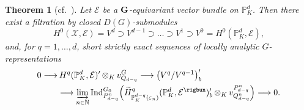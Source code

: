 \documentclass[a4paper, reqno, 10pt]{amsart}
\newtheorem{theorem}{Theorem}[subsection]
\theoremstyle{definition}
\numberwithin{equation}{section}
\newcommand{\botimes}[1]{{\,\otimes_{#1}\,}}
\newcommand{\Ind}{{\mathrm{Ind}}}
\newcommand{\lra}{\longrightarrow}
\newcommand{\BN}{{\mathbb {N}}}
\newcommand{\BP}{{\mathbb {P}}}
\newcommand{\CE}{{\mathcal {E}}}
\newcommand{\CX}{{\mathcal {X}}}
\newcommand{\bG}{{\mathrm{\bf G}}}
\begin{document}
\begin{theorem}[{cf.\ \cite[Thm.\ 2.2.8]{Orlik08EquivVBDrinfeldUpHalfSp}}]\label{Thm 3 - Orliks theorem on global sections of an equivariant vector bundle on the DHS}
	Let $\CE$ be a $\bG$-equivariant vector bundle on $\BP_K^d$.
	Then there exist a filtration by closed $D(G)$-submodules
	\begin{equation*}
		H^0 (\CX,\CE) = V^d \supset V^{d-1} \supset \ldots \supset V^{1} \supset V^{0} = H^0(\BP_K^d, \CE) ,
	\end{equation*}
	and, for $q = 1,\ldots, d$, short strictly exact sequences of locally analytic $G$-representations
	\begin{equation}\label{Eq 3 - Extension from spectral sequence}
		\begin{aligned}
			0 \lra &{\hspace{2pt}} H^q (\BP_K^d, \CE)' \botimes{K} v^G_{Q_{d-q}} \lra \big(V^q/V^{q-1} \big)'_b \\
			&\lra \varinjlim_{n\in \BN} \Ind^{G_0}_{P^n_{d-q}} \Big( \widetilde{H}^q_{\BP_K^{d-q} (\varepsilon_n)} (\BP_K^d, \CE^\rigbun)'_b \botimes{K} v^{P^n_{d-q}}_{Q^n_{d-q}} \Big) \lra 0 .
		\end{aligned}
	\end{equation}
\end{theorem}
\end{document}
